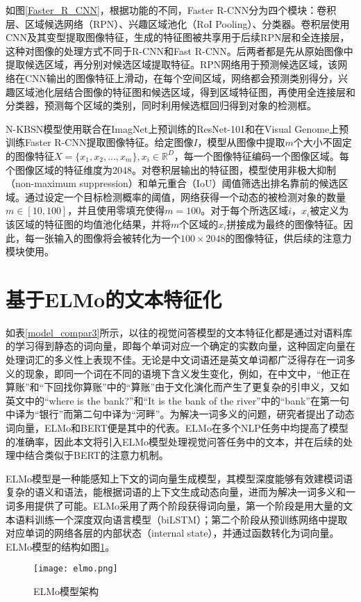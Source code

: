如图\ref{Faster_R_CNN}，根据功能的不同，Faster R-CNN分为四个模块：卷积层、区域候选网络（RPN）、兴趣区域池化（RoI Pooling）、分类器。卷积层使用CNN及其变型提取图像特征，生成的特征图被共享用于后续RPN层和全连接层，这种对图像的处理方式不同于R-CNN和Fast R-CNN。后两者都是先从原始图像中提取候选区域，再分别对候选区域提取特征。RPN网络用于预测候选区域，该网络在CNN输出的图像特征上滑动，在每个空间区域，网络都会预测类别得分，兴趣区域池化层结合图像的特征图和候选区域，得到区域特征图，再使用全连接层和分类器，预测每个区域的类别，同时利用候选框回归得到对象的检测框。

N-KBSN模型使用联合在ImagNet上预训练的ResNet-101和在Visual Genome上预训练Faster R-CNN提取图像特征。给定图像$I$，模型从图像中提取$m$个大小不固定的图像特征$X=\{x_1, x_2, ..., x_m\}, x_i \in \mathbb{R}^D$，每一个图像特征编码一个图像区域。每个图像区域的特征维度为2048。对卷积层输出的特征图，模型使用非极大抑制（non-maximum suppression）和单元重合（IoU）阈值筛选出排名靠前的候选区域。通过设定一个目标检测概率的阈值，网络获得一个动态的被检测对象的数量$m \in [10,100]$，并且使用零填充使得$m=100$。对于每个所选区域$i$，$x_i$被定义为该区域的特征图的均值池化结果，并将$m$个区域的$x_i$拼接成为最终的图像特征。因此，每一张输入的图像将会被转化为一个$100\times 2048$的图像特征，供后续的注意力模块使用。

\section{基于ELMo的文本特征化}

如表\ref{model_compar3}所示，以往的视觉问答模型的文本特征化都是通过对语料库的学习得到静态的词向量，即每个单词对应一个确定的实数向量，这种固定向量在处理词汇的多义性上表现不佳。无论是中文词语还是英文单词都广泛得存在一词多义的现象，即同一个词在不同的语境下含义发生变化，例如，在中文中，“他正在算账”和“下回找你算账”中的“算账”由于文化演化而产生了更复杂的引申义，又如英文中的“where is the bank?”和“It is the bank of the river”中的“bank”在第一句中译为“银行”而第二句中译为“河畔”。为解决一词多义的问题，研究者提出了动态词向量，ELMo和BERT便是其中的代表。ELMo在多个NLP任务中均提高了模型的准确率，因此本文将引入ELMo模型处理视觉问答任务中的文本，并在后续的处理中结合类似于BERT的注意力机制。

ELMo模型是一种能感知上下文的词向量生成模型，其模型深度能够有效建模词语复杂的语义和语法，能根据词语的上下文生成动态向量，进而为解决一词多义和一词多用提供了可能。ELMo采用了两个阶段获得词向量，第一个阶段是用大量的文本语料训练一个深度双向语言模型（biLSTM）；第二个阶段从预训练网络中提取对应单词的网络各层的内部状态（internal state），并通过函数转化为词向量。ELMo模型的结构如图\ref{elmo}。
\begin{figure}[H]
	\texttt{[image: elmo.png]}
	\caption{ELMo模型架构}
	\label{elmo}
\end{figure}

